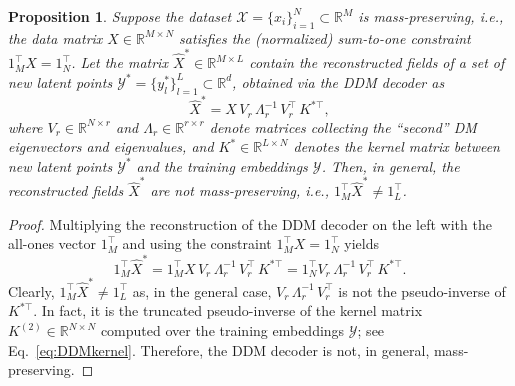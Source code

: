 \documentclass{article}
\newtheorem{prop}{Proposition}
\begin{document}
\begin{prop} \label{prop:DDM_cons}
Suppose the dataset $\mathcal{X}=\{x_i\}_{i=1}^N\subset\mathbb{R}^M$ is mass-preserving, i.e., the data matrix $X \in \mathbb{R}^{M \times N}$ satisfies the (normalized) sum-to-one constraint $1_M^\top X = 1_N^\top$. Let the matrix $\widehat{X}^* \in \mathbb{R}^{M \times L}$ contain the reconstructed fields of a set of new latent points $\mathcal{Y}^*=\{ y^*_l\}_{l=1}^L\subset\mathbb{R}^d$, obtained via the DDM decoder as
\begin{equation*}
    \widehat{X}^* = X\,V_r\, \Lambda_r^{-1} \, V_r^\top \, K^{*\top},
\end{equation*}
where $V_r \in \mathbb{R}^{N \times r}$ and $\Lambda_r \in \mathbb{R}^{r \times r}$ denote matrices collecting the ``second'' DM eigenvectors and eigenvalues, and $K^* \in \mathbb{R}^{L \times N}$ denotes the kernel matrix between new latent points $\mathcal{Y}^*$ and the training embeddings $\mathcal{Y}$. Then, in general, the reconstructed fields $\widehat{X}^*$ are not mass-preserving, i.e., $1_M^\top \widehat{X}^* \neq 1_L^\top$.
\end{prop}
\begin{proof}
Multiplying the reconstruction of the DDM decoder on the left with the all-ones vector $1_M^\top$ and using the constraint $1_M^\top X = 1_N^\top$ yields
\begin{equation}
1_M^\top  \widehat{X}^{*}= 1_M^\top X \,V_r\, \Lambda_r^{-1}\, V_r^\top \, K^{*\top}=1_N^\top V_r
\,\Lambda_r^{-1}\, V_r^\top \, K^{*\top}.
\end{equation}
Clearly, $1_M^\top  \widehat{X}^{*}\neq 1_{L}^\top$ as, in the general case, $V_r \,\Lambda_r^{-1}\, V_r^\top $ is not the pseudo-inverse of $K^{*\top}$. In fact, it is the truncated pseudo-inverse of the kernel matrix $K^{(2)}\in\mathbb{R}^{N \times N}$ computed over the training embeddings $\mathcal{Y}$; see Eq.~\eqref{eq:DDMkernel}. Therefore, the DDM decoder is not, in general, mass-preserving.
\end{proof}
\end{document}
